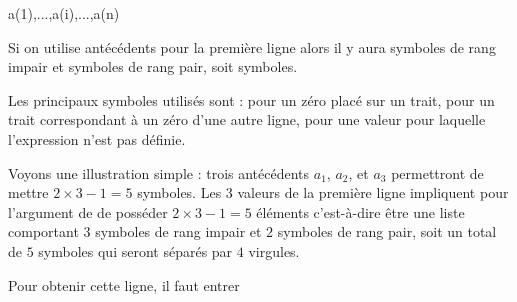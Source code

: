 \begin{tkzltxexample}[]
            { a(1),...,a(i),...,a(n)} %
\end{tkzltxexample}


\medskip
Si on utilise  antécédents pour la première ligne alors il y aura  symboles de rang impair et  symboles de rang pair, soit  symboles. 

 Les principaux symboles  utilisés sont :  pour un zéro placé sur un trait,  pour un trait correspondant  à un zéro d'une autre ligne,  pour une valeur pour laquelle l'expression n'est pas définie.
 
Voyons une illustration  simple : trois antécédents $a_1$, $a_2$, et $a_3$ permettront de mettre $2\times3 -1 =5$ symboles. Les $3$ valeurs de la première ligne impliquent pour l'argument de    de posséder {$2\times 3-1=5$} éléments  c'est-à-dire être une liste comportant   $3$ symboles de rang impair et $2$ symboles de rang pair, soit un total de $5$ symboles qui seront séparés par $4$ virgules.

\begin{center}
\end{center}

Pour obtenir cette ligne, il faut entrer
\begin{tkzexample}
\end{tkzexample}     
  




